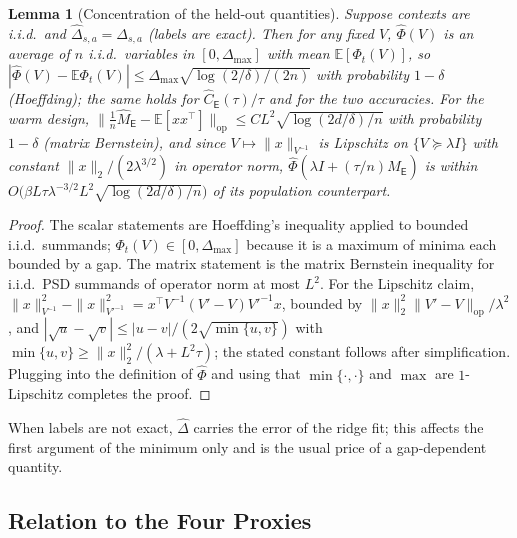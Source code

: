 \documentclass{article}
\newtheorem{lemma}{Lemma}
\theoremstyle{definition}
\theoremstyle{remark}
\newcommand{\E}{\mathbb{E}}
\theoremstyle{remark}
\newcommand{\Exp}{\mathsf{E}}
\begin{document}
\begin{lemma}[Concentration of the held-out quantities]
\label{lem:diag-concentration}
Suppose contexts are i.i.d.\ and $\widehat\Delta_{s,a}=\Delta_{s,a}$ (labels are
exact). Then for any fixed $V$, $\widehat\Phi(V)$ is an average of $n$ i.i.d.\
variables in $[0,\Delta_{\max}]$ with mean $\E[\Phi_t(V)]$, so
$|\widehat\Phi(V)-\E\Phi_t(V)|\le\Delta_{\max}\sqrt{\log(2/\delta)/(2n)}$ with
probability $1-\delta$ (Hoeffding); the same holds for
$\widehat C_{\Exp}(\tau)/\tau$ and for the two accuracies. For the warm design,
$\|\tfrac1n\widehat M_{\Exp}-\E[xx^\top]\|_{\mathrm{op}}\le CL^2\sqrt{\log(2d/\delta)/n}$
with probability $1-\delta$ (matrix Bernstein), and since
$V\mapsto\|x\|_{V^{-1}}$ is Lipschitz on $\{V\succeq\lambda I\}$ with constant
$\|x\|_2/(2\lambda^{3/2})$ in operator norm, $\widehat\Phi(\lambda I+(\tau/n)\widehat M_{\Exp})$
is within $O\bigl(\beta L\tau\lambda^{-3/2}L^2\sqrt{\log(2d/\delta)/n}\bigr)$ of
its population counterpart.
\end{lemma}

\begin{proof}
The scalar statements are Hoeffding's inequality applied to bounded i.i.d.\
summands; $\Phi_t(V)\in[0,\Delta_{\max}]$ because it is a maximum of minima
each bounded by a gap. The matrix statement is the matrix Bernstein inequality
for i.i.d.\ PSD summands of operator norm at most $L^2$. For the Lipschitz
claim, $\|x\|^2_{V^{-1}}-\|x\|^2_{V'^{-1}}=x^\top V^{-1}(V'-V)V'^{-1}x$, bounded by
$\|x\|_2^2\|V'-V\|_{\mathrm{op}}/\lambda^2$, and $|\sqrt u-\sqrt v|\le|u-v|/(2\sqrt{\min\{u,v\}})$
with $\min\{u,v\}\ge\|x\|_2^2/(\lambda+L^2\tau)$; the stated constant follows
after simplification. Plugging into the definition of $\widehat\Phi$ and
using that $\min\{\cdot,\cdot\}$ and $\max$ are $1$-Lipschitz completes the
proof.
\end{proof}

When labels are not exact, $\widehat\Delta$ carries the error of the ridge
fit; this affects the first argument of the minimum only and is the usual
price of a gap-dependent quantity.

\subsection{Relation to the Four Proxies}
\label{app:proxies}
\end{document}
